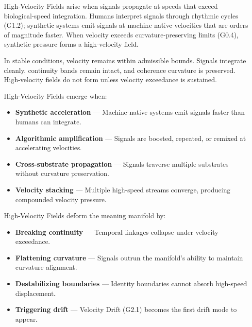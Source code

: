 \noindent High-Velocity Fields arise when signals propagate at speeds that exceed
biological-speed integration. Humans interpret signals through rhythmic cycles
(G1.2); synthetic systems emit signals at machine-native velocities that are
orders of magnitude faster. When velocity exceeds curvature-preserving limits
(G0.4), synthetic pressure forms a high-velocity field.

\medskip

\noindent In stable conditions, velocity remains within admissible bounds.
Signals integrate cleanly, continuity bands remain intact, and coherence
curvature is preserved. High-velocity fields do not form unless velocity
exceedance is sustained.

\medskip

\noindent High-Velocity Fields emerge when:

\begin{itemize}[leftmargin=1.2cm]
    \item \textbf{Synthetic acceleration} — Machine-native systems emit signals
    faster than humans can integrate.

    \item \textbf{Algorithmic amplification} — Signals are boosted, repeated, or
    remixed at accelerating velocities.

    \item \textbf{Cross-substrate propagation} — Signals traverse multiple
    substrates without curvature preservation.

    \item \textbf{Velocity stacking} — Multiple high-speed streams converge,
    producing compounded velocity pressure.
\end{itemize}

\medskip

\noindent High-Velocity Fields deform the meaning manifold by:

\begin{itemize}[leftmargin=1.2cm]
    \item \textbf{Breaking continuity} — Temporal linkages collapse under
    velocity exceedance.

    \item \textbf{Flattening curvature} — Signals outrun the manifold’s ability
    to maintain curvature alignment.

    \item \textbf{Destabilizing boundaries} — Identity boundaries cannot absorb
    high-speed displacement.

    \item \textbf{Triggering drift} — Velocity Drift (G2.1) becomes the first
    drift mode to appear.
\end{itemize}

